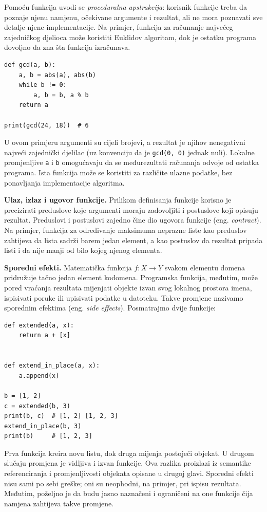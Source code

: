 Pomoću funkcija uvodi se \textit{proceduralna apstrakcija}: korisnik funkcije treba da poznaje njenu namjenu, očekivane argumente i rezultat, ali ne mora poznavati sve detalje njene implementacije. Na primjer, funkcija za računanje najvećeg zajedničkog djelioca može koristiti Euklidov algoritam, dok je ostatku programa dovoljno da zna šta funkcija izračunava.

\begin{verbatim}
def gcd(a, b):
    a, b = abs(a), abs(b)
    while b != 0:
        a, b = b, a % b
    return a

print(gcd(24, 18))  # 6
\end{verbatim}

U ovom primjeru argumenti su cijeli brojevi, a rezultat je njihov nenegativni najveći zajednički djelilac (uz konvenciju da je \texttt{gcd(0, 0)} jednak nuli). Lokalne promjenljive \texttt{a} i \texttt{b} omogućavaju da se međurezultati računanja odvoje od ostatka programa. Ista funkcija može se koristiti za različite ulazne podatke, bez ponavljanja implementacije algoritma.

\textbf{Ulaz, izlaz i ugovor funkcije.} Prilikom definisanja funkcije korisno je precizirati preduslove koje argumenti moraju zadovoljiti i postuslove koji opisuju rezultat. Preduslovi i postuslovi zajedno čine dio ugovora funkcije (eng. \textit{contract}). Na primjer, funkcija za određivanje maksimuma neprazne liste kao preduslov zahtijeva da lista sadrži barem jedan element, a kao postuslov da rezultat pripada listi i da nije manji od bilo kojeg njenog elementa.

\textbf{Sporedni efekti.} Matematička funkcija $f:X\to Y$ svakom elementu domena pridružuje tačno jedan element kodomena. Programska funkcija, međutim, može pored vraćanja rezultata mijenjati objekte izvan svog lokalnog prostora imena, ispisivati poruke ili upisivati podatke u datoteku. Takve promjene nazivamo sporednim efektima (eng. \textit{side effects}). Posmatrajmo dvije funkcije:

\begin{verbatim}
def extended(a, x):
    return a + [x]


def extend_in_place(a, x):
    a.append(x)

b = [1, 2]
c = extended(b, 3)
print(b, c)  # [1, 2] [1, 2, 3]
extend_in_place(b, 3)
print(b)     # [1, 2, 3]
\end{verbatim}

Prva funkcija kreira novu listu, dok druga mijenja postojeći objekat. U drugom slučaju promjena je vidljiva i izvan funkcije. Ova razlika proizlazi iz semantike referenciranja i promjenljivosti objekata opisane u drugoj glavi. Sporedni efekti nisu sami po sebi greške; oni su neophodni, na primjer, pri ispisu rezultata. Međutim, poželjno je da budu jasno naznačeni i ograničeni na one funkcije čija namjena zahtijeva takve promjene.

